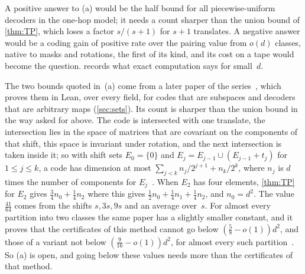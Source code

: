 A positive answer to (a) would be the half bound for all piecewise-uniform decoders in the one-hop model; it needs a
count sharper than the union bound of \cref{thm:TP}, which loses a factor $s/(s+1)$ for $s+1$ translates. A negative
answer would be a coding gain of positive rate over the pairing value from $o(d)$ classes, native to masks and
rotations, the first of its kind, and its cost on a tape would become the question.  records what exact
computation says for small~$d$.

The two bounds quoted in~(a) come from a later paper of the series~\cite{SharedDecoders2026}, which proves them in
Lean, over every field, for codes that are subspaces and decoders that are arbitrary maps (\cref{sec:sets}). Its count
is sharper than the union bound in the way asked for above. The code is intersected with one translate, the
intersection lies in the space of matrices that are covariant on the components of that shift, this space is
invariant under rotation, and the next intersection is taken inside it; so with shift sets $E_0=\{0\}$ and
$E_j=E_{j-1}\cup(E_{j-1}+t_j)$ for $1\le j\le k$, a code has dimension at most
$\sum_{j<k}n_j/2^{j+1}+n_k/2^k$, where $n_j$ is $d$ times the number of components for
$E_j$~\cite[Theorem~3.2]{SharedDecoders2026}. When $E_2$ has four elements, \cref{thm:TP} for $E_2$ gives
$\tfrac34n_0+\tfrac14n_2$ where this gives $\tfrac12n_0+\tfrac14n_1+\tfrac14n_2$, and $n_0=d^2$. The value $\tfrac{41}{64}$ comes from the shifts $s,3s,9s$ and an average over~$s$. For
almost every partition into two classes the same paper has a slightly smaller constant, and it proves that the
certificates of this method cannot go below $(\tfrac58-o(1))d^2$, and those of a variant not below
$(\tfrac9{16}-o(1))d^2$, for almost every such partition~\cite[Theorems~C.5, C.6 and~C.7]{SharedDecoders2026}. So (a) is open, and going below
these values needs more than the certificates of that method.

